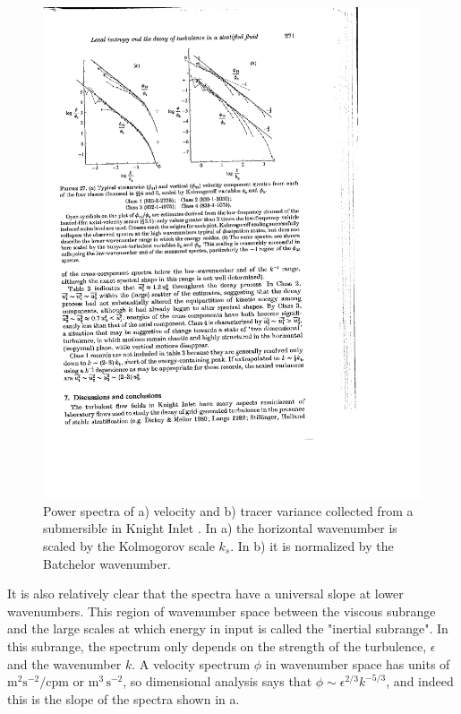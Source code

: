 \documentclass[11pt]{article}
\begin{document}
\begin{figure}[hbtp]
  \begin{center}\includegraphics[width=4.5in]{images/GargettEtal84Fig27}     
  \caption{Power spectra of  a) velocity and b) tracer variance collected from
a submersible in Knight Inlet \citep{gargettetal84}.  In a) the horizontal
wavenumber is scaled by the Kolmogorov scale $k_s$.  In b) it is normalized by
the Batchelor wavenumber.}
    \label{fig:GargettEtal84Fig27}
  \end{center}
\end{figure}

It is also relatively clear that the spectra have a universal slope at lower
wavenumbers.  This region of wavenumber space between the viscous subrange and
the large scales at which energy in input is called the "inertial subrange". 
In this subrange, the spectrum only depends on the strength of the turbulence,
$\epsilon$ and the wavenumber $k$.  A velocity spectrum $\phi$ in wavenumber
space has units of $\mathrm{m^2s^{-2} / cpm}$ or $\mathrm{m^3\,s^{-2}}$, so
dimensional analysis says that $\phi \sim \epsilon^{2/3}k^{-5/3}$, and indeed
this is the slope of the spectra shown in a. 
\end{document}
